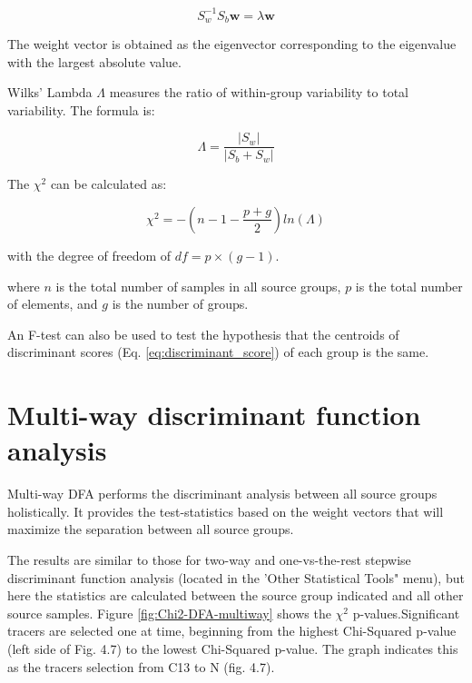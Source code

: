 \documentclass[12pt]{report}
\begin{document}
\begin{equation}
    S_w^{-1}S_b \mathbf{w} = \lambda \mathbf{w}
\end{equation}

The weight vector is obtained as the eigenvector corresponding to the eigenvalue with the largest absolute value. 

Wilks' Lambda $\Lambda$ measures the ratio of within-group variability to total variability. The formula is:

\begin{equation}
    \Lambda = \frac{|S_w|}{|S_b+S_w|}
\end{equation}

The $\chi^2$ can be calculated as:

\begin{equation}
    \chi^2 = -\left(n-1-\frac{p+g}{2}\right)ln(\Lambda)
\end{equation}

with the degree of freedom  of $df = p\times(g-1)$.

where $n$ is the total number of samples in all source groups, $p$ is the total number of elements, and $g$ is the number of groups. 

An F-test can also be used to test the hypothesis that the centroids of discriminant scores (Eq. \ref{eq:discriminant_score}) of each group is the same. 

\section{Multi-way discriminant function analysis}

Multi-way DFA performs the discriminant analysis between all source groups holistically. It provides the test-statistics based on the weight vectors that will maximize the separation between all source groups. 

The results are similar to those for two-way and one-vs-the-rest stepwise discriminant function analysis (located in the 'Other Statistical Tools" menu), but here the statistics are calculated between the source group indicated and all other source samples. Figure \ref{fig:Chi2-DFA-multiway} shows the $\chi^2$ p-values.Significant tracers are selected one at time, beginning from the highest Chi-Squared p-value (left side of Fig. 4.7) to the lowest Chi-Squared p-value.  The graph indicates this as the tracers selection from C13 to N (fig. 4.7).
\end{document}
